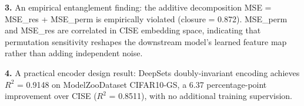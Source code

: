 \textbf{3.} An empirical entanglement finding: the additive decomposition MSE = MSE\_res + MSE\_perm is empirically violated (closure = 0.872). MSE\_perm and MSE\_res are correlated in CISE embedding space, indicating that permutation sensitivity reshapes the downstream model's learned feature map rather than adding independent noise.

\textbf{4.} A practical encoder design result: DeepSets doubly-invariant encoding achieves $R^2$ = 0.9148 on ModelZooDataset CIFAR10-GS, a 6.37 percentage-point improvement over CISE ($R^2$ = 0.8511), with no additional training supervision.

